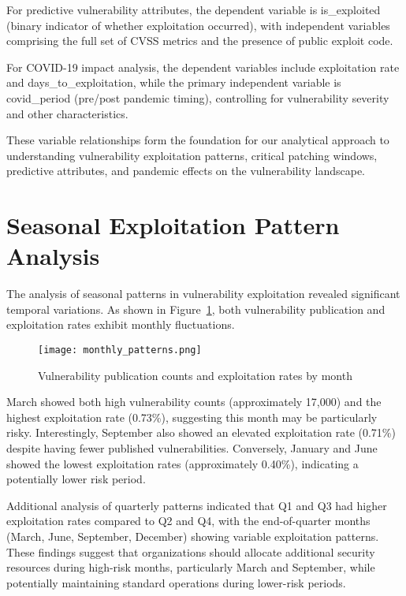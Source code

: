 \documentclass[runningheads]{llncs}
\begin{document}
For predictive vulnerability attributes, the dependent variable is is\_exploited (binary indicator of whether exploitation occurred), with independent variables comprising the full set of CVSS metrics and the presence of public exploit code.

For COVID-19 impact analysis, the dependent variables include exploitation rate and days\_to\_exploitation, while the primary independent variable is covid\_period (pre/post pandemic timing), controlling for vulnerability severity and other characteristics.

These variable relationships form the foundation for our analytical approach to understanding vulnerability exploitation patterns, critical patching windows, predictive attributes, and pandemic effects on the vulnerability landscape.


\section{Seasonal Exploitation Pattern Analysis}
The analysis of seasonal patterns in vulnerability exploitation revealed significant temporal variations. As shown in Figure~\ref{fig:monthly_pattern}, both vulnerability publication and exploitation rates exhibit monthly fluctuations.

\begin{figure}[htbp]
\centering
\texttt{[image: monthly\_patterns.png]}
\caption{Vulnerability publication counts and exploitation rates by month}
\label{fig:monthly_pattern}
\end{figure}

March showed both high vulnerability counts (approximately 17,000) and the highest exploitation rate (0.73\%), suggesting this month may be particularly risky. Interestingly, September also showed an elevated exploitation rate (0.71\%) despite having fewer published vulnerabilities. Conversely, January and June showed the lowest exploitation rates (approximately 0.40\%), indicating a potentially lower risk period.

Additional analysis of quarterly patterns indicated that Q1 and Q3 had higher exploitation rates compared to Q2 and Q4, with the end-of-quarter months (March, June, September, December) showing variable exploitation patterns. These findings suggest that organizations should allocate additional security resources during high-risk months, particularly March and September, while potentially maintaining standard operations during lower-risk periods.
\end{document}

